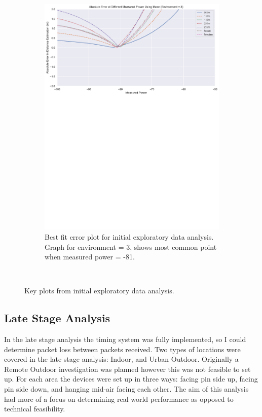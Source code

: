 \documentclass{l4proj}
\begin{document}
\begin{figure}[!htb]
\begin{subfigure}[b]{0.40\textwidth}
        \includegraphics[width=\textwidth]{images/initial_mp_bestfit.pdf}
        \caption{Best fit error plot for initial exploratory data analysis. Graph for environment = 3, shows most common point when measured power = -81.}
        \label{fig:initial_best_fit}
    \end{subfigure}
    ~ %
    \caption{ Key plots from initial exploratory data analysis. }
    \label{fig:density_plots}
\end{figure}

\subsection{Late Stage Analysis}

In the late stage analysis the timing system was fully implemented, so I could determine packet loss between packets received. Two types of locations were covered in the late stage analysis: Indoor, and Urban Outdoor. Originally a Remote Outdoor investigation was planned however this was not feasible to set up. For each area the devices were set up in three ways: facing pin side up, facing pin side down, and hanging mid-air facing each other. The aim of this analysis had more of a focus on determining real world performance as opposed to technical feasibility.
\end{document}
